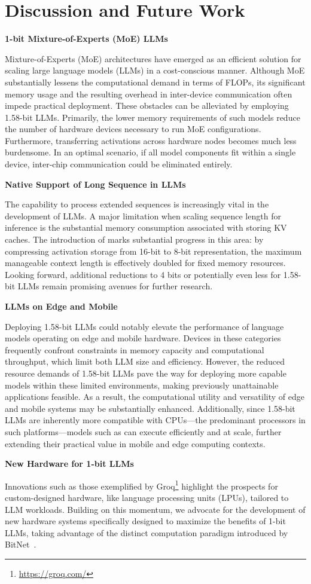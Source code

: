 \section{Discussion and Future Work}

\textbf{1-bit Mixture-of-Experts (MoE) LLMs}

Mixture-of-Experts (MoE) architectures have emerged as an efficient solution for scaling large language models (LLMs) in a cost-conscious manner. Although MoE substantially lessens the computational demand in terms of FLOPs, its significant memory usage and the resulting overhead in inter-device communication often impede practical deployment. These obstacles can be alleviated by employing 1.58-bit LLMs. Primarily, the lower memory requirements of such models reduce the number of hardware devices necessary to run MoE configurations. Furthermore, transferring activations across hardware nodes becomes much less burdensome. In an optimal scenario, if all model components fit within a single device, inter-chip communication could be eliminated entirely.

\textbf{Native Support of Long Sequence in LLMs}

The capability to process extended sequences is increasingly vital in the development of LLMs. A major limitation when scaling sequence length for inference is the substantial memory consumption associated with storing KV caches. The introduction of  marks substantial progress in this area: by compressing activation storage from 16-bit to 8-bit representation, the maximum manageable context length is effectively doubled for fixed memory resources. Looking forward, additional reductions to 4 bits or potentially even less for 1.58-bit LLMs remain promising avenues for further research.

\textbf{LLMs on Edge and Mobile}

Deploying 1.58-bit LLMs could notably elevate the performance of language models operating on edge and mobile hardware. Devices in these categories frequently confront constraints in memory capacity and computational throughput, which limit both LLM size and efficiency. However, the reduced resource demands of 1.58-bit LLMs pave the way for deploying more capable models within these limited environments, making previously unattainable applications feasible. As a result, the computational utility and versatility of edge and mobile systems may be substantially enhanced. Additionally, since 1.58-bit LLMs are inherently more compatible with CPUs—the predominant processors in such platforms—models such as  can execute efficiently and at scale, further extending their practical value in mobile and edge computing contexts.

\textbf{New Hardware for 1-bit LLMs}

Innovations such as those exemplified by Groq\footnote{\url{https://groq.com/}} highlight the prospects for custom-designed hardware, like language processing units (LPUs), tailored to LLM workloads. Building on this momentum, we advocate for the development of new hardware systems specifically designed to maximize the benefits of 1-bit LLMs, taking advantage of the distinct computation paradigm introduced by BitNet~\cite{bitnet}.

